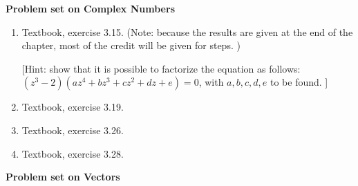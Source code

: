 \documentclass[fleqn]{article}
\begin{document}

\pagebreak


\textbf{Problem set on Complex Numbers}

\begin{enumerate}

  \item  Textbook, exercise 3.15. (Note: because the results are given at the end of the chapter, most of the  credit will be given for steps. ) 
  
  [Hint:  show that it is possible to factorize the equation as follows: $(z^3-2)(a z^4 + b z^3 + c z^2 + d z + e)=0$, with $a,b,c,d,e$ to be found. ]
  
  \item  Textbook, exercise 3.19.
  
  \item  Textbook, exercise 3.26.
  
  \item  Textbook, exercise 3.28. 
  
\end{enumerate}


\pagebreak

\textbf{Problem set on Vectors}
\end{document}
